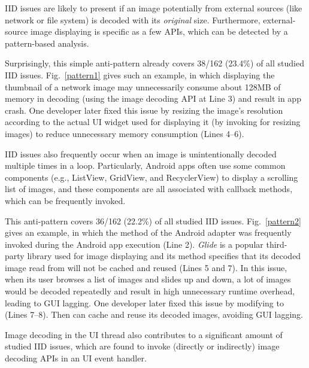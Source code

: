 IID issues are likely to present if an image potentially from external sources (like network or file system) is decoded with its \emph{original} size.
Furthermore, external-source image displaying is specific as a few APIs,
which can be detected by a pattern-based analysis.

Surprisingly, this simple anti-pattern already covers 38/162 (23.4\%) of all studied IID issues.
Fig.~\ref{pattern1} gives such an example, in which displaying the thumbnail of a network image may unnecessarily consume about 128MB of memory in decoding (using the image decoding API  at Line 3) and result in app crash. One developer later fixed this issue by resizing the image's resolution according to the actual UI widget used for displaying it (by invoking  for resizing images) to reduce unnecessary memory consumption (Lines 4--6).



IID issues also frequently occur when an image is unintentionally decoded multiple times in a loop. Particularly, Android apps often use some common components (e.g., ListView, GridView, and RecyclerView) to display a scrolling list of images, and these components are all associated with callback methods, which can be frequently invoked.

This anti-pattern covers 36/162 (22.2\%) of all studied IID issues. Fig.~\ref{pattern2} gives an example, in which the method  of the Android  adapter was frequently invoked during the Android app execution (Line 2). \emph{Glide} is a popular third-party library used for image displaying and its method  specifies that its decoded image read from  will not be cached and reused (Lines 5 and 7). In this issue, when its user browses a list of images and slides up and down, a lot of images would be decoded repeatedly and result in high unnecessary runtime overhead, leading to GUI lagging. One developer later fixed this issue by modifying  to  (Lines 7--8). Then  can cache and reuse its decoded images, avoiding GUI lagging.

Image decoding in the UI thread also contributes to a significant amount of studied IID issues,
which are found to invoke (directly or indirectly) image decoding APIs in an UI event handler.

